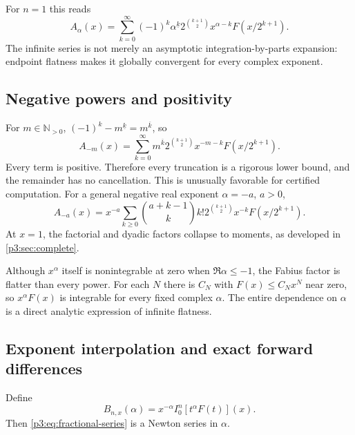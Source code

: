 \documentclass[11pt,oneside]{article}
\theoremstyle{definition}
\theoremstyle{remark}
\newcommand{\N}{\mathbb N}
\newcommand{\fall}[2]{#1^{\underline{#2}}}
\newcommand{\rise}[2]{#1^{\overline{#2}}}
\newcommand{\1}{\mathbf 1}
\begin{document}
For $n=1$ this reads
\begin{equation}
 \boxed{
 A_\alpha(x)=
 \sum_{k=0}^{\infty}(-1)^k\fall\alpha k
 2^{\binom{k+1}{2}}x^{\alpha-k}F(x/2^{k+1}).}
 \label{p3:eq:A-series}
\end{equation}
The infinite series is not merely an asymptotic integration-by-parts expansion: endpoint
flatness makes it globally convergent for every complex exponent.

\subsection{Negative powers and positivity}

For $m\in\N_{>0}$, $(-1)^k\fall{-m}k=\rise mk$, so
\begin{equation}
 \boxed{
 A_{-m}(x)=\sum_{k=0}^{\infty}\rise mk
 2^{\binom{k+1}{2}}x^{-m-k}F(x/2^{k+1}).}
 \label{p3:eq:negative-integer-series}
\end{equation}
Every term is positive.  Therefore every truncation is a rigorous lower bound, and the
remainder has no cancellation.  This is unusually favorable for certified computation.
For a general negative real exponent $\alpha=-a$, $a>0$,
\begin{equation}
 A_{-a}(x)=x^{-a}\sum_{k\ge0}\binom{a+k-1}{k}k!
 2^{\binom{k+1}{2}}x^{-k}F(x/2^{k+1}).                       \label{p3:eq:negative-real-series}
\end{equation}
At $x=1$, the factorial and dyadic factors collapse to moments, as developed in
\cref{p3:sec:complete}.

\begin{remark}
Although $x^\alpha$ itself is nonintegrable at zero when $\Re\alpha\le-1$, the Fabius factor
is flatter than every power.  For each $N$ there is $C_N$ with $F(x)\le C_Nx^N$ near zero,
so $x^\alpha F(x)$ is integrable for every fixed complex $\alpha$.  The entire dependence on
$\alpha$ is a direct analytic expression of infinite flatness.
\end{remark}

\subsection{Exponent interpolation and exact forward differences}

Define
\begin{equation}
 B_{n,x}(\alpha)=x^{-\alpha}I_0^n[t^\alpha F(t)](x).           \label{p3:eq:Bnx}
\end{equation}
Then \eqref{p3:eq:fractional-series} is a Newton series in $\alpha$.
\end{document}
